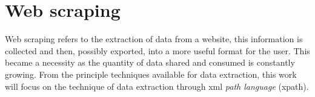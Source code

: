 






\section{Web scraping}
\label{s:web_scraping}

Web scraping refers to the extraction of data from a website, this information is collected and then, possibly exported, into a more useful format for the user. This became a necessity as the quantity of data shared and consumed is constantly growing. From the principle techniques available for data extraction, this work will focus on the technique of data extraction through \acrlong{xml} \textit{path language} (\acrshort{xpath}).

